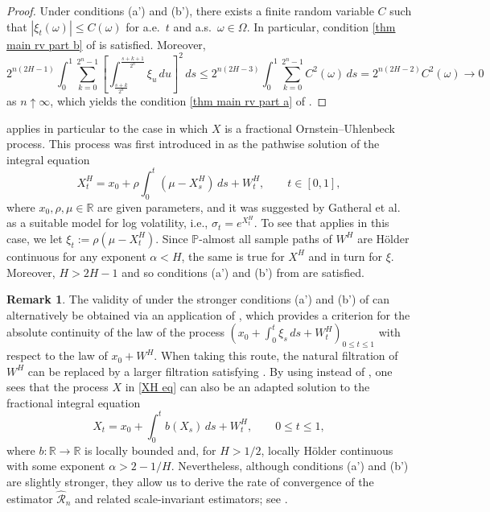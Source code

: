 \documentclass[12pt,reqno]{article}
\def\ua{\uparrow}
\def\wh{\widehat}
\numberwithin{equation}{section}
\def\cR{{\mathscr R}}
\theoremstyle{definition}
\newtheorem{remark}[theorem]{Remark}
\def\ua{\uparrow}
\def\wh{\widehat}
\newcommand{\bR}{\mathbb{R}}
\newcommand{\bP}{\mathbb{P}}
\begin{document}
\begin{proof} Under conditions (a') and (b'),  there exists a finite random variable $C$ such that $|\xi_t(\omega)| \le C(\omega)$ for a.e.~$t$ and a.s.~$\omega \in \Omega$. In particular, condition \ref{thm main rv part b} of   is satisfied. Moreover, 
	\begin{equation*}
		2^{n(2H-1)}\int_{0}^{1}\sum_{k = 0}^{2^n-1}\left[\int_{\frac{s+k}{2^n}}^{\frac{s+k+1}{2^n}}\xi_u\,du\right]^2 \,ds \le 2^{n(2H-3)}\int_{0}^{1}\sum_{k = 0}^{2^n-1} C^2(\omega) \,ds = 2^{n(2H-2)} C^2(\omega) \rightarrow 0
	\end{equation*}
	as $n \ua \infty$, which yields the condition \ref{thm main rv part a} of . 
\end{proof}

 applies in particular to the case in which $X$ is a  fractional Ornstein--Uhlenbeck process.
	This process
	was first introduced in \cite{CheriditoFOU} as the pathwise solution of the integral equation
	\begin{equation}\label{OU process eq 2}
		X^H_t=x_0+\rho\int_0^t(\mu-X^H_s)\,ds+W^H_t,\qquad t\in[0,1],
	\end{equation}
	where $x_0,\rho,\mu\in\mathbb{R}$ are given parameters, and it was suggested by  Gatheral et al.~\cite{GatheralRosenbaum} as a suitable model for log volatility, i.e., $\sigma_t=e^{X^H_t}$. To see that   applies in this case, we let  $\xi_t:= \rho(\mu-X_t^H)$. Since $\bP$-almost all sample paths of $W^H$ are H\"older continuous  for any exponent $\alpha<H$, the same is true for $X^H$ and in turn for $\xi$. Moreover, 
  $H>2H-1$ and so conditions (a') and (b') from   are satisfied.
	
	
	\begin{remark}\label{thm main rv variants remark} The validity of  under the stronger conditions (a') and (b') of  can alternatively be obtained via an application of \cite[Theorem 1.4]{HanSchiedGirsanov}, which provides a criterion for the absolute continuity of the law of the process $(x_0+\int_0^t\xi_s\,ds+W^H_t)_{0\le t\le 1}$ with respect to the law of $x_0+W^H$. When taking this route, the natural filtration of $W^H$ can be replaced by a larger filtration satisfying \cite[Definition 1.3]{HanSchiedGirsanov}. By using \cite[Theorem 1.6]{HanSchiedGirsanov} instead of \cite[Theorem 1.4]{HanSchiedGirsanov}, one sees that the process $X$ in \eqref{XH eq} can also be  an adapted solution to the fractional integral equation  
	\begin{equation}\label{eq integral equ}
		X_t=x_0+\int_0^tb(X_s)\,ds+W^H_t,\qquad 0\le t\le1,
	\end{equation}
	where $b:\bR\to\bR$ is locally bounded and, for $H>1/2$, locally H\"older continuous with some exponent $\alpha>2-1/H$. Nevertheless, although conditions (a') and (b') are slightly stronger, they allow us to derive the rate of convergence of the estimator $\wh \cR_n$ and related scale-invariant estimators; see .	\end{remark}
\end{document}
